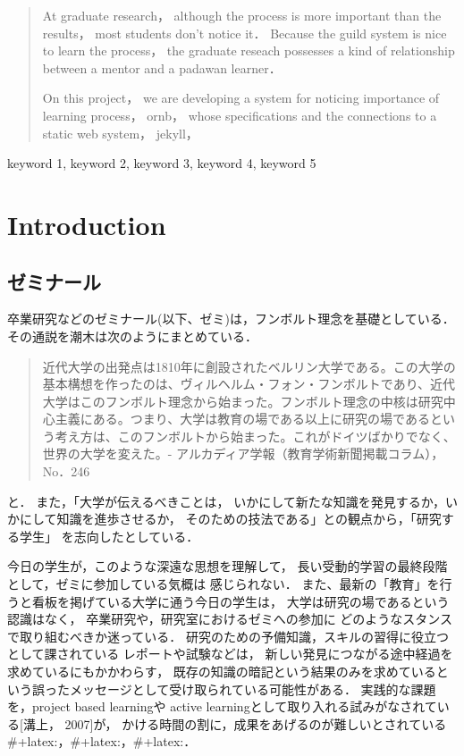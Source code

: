 \documentclass{hissymp}
\author{\texttt{S}}
\date{}
\begin{document}
\begin{abstract}
\label{sec:org0fa9d33}
At graduate research，
although the process is more important than the results，
most students don't notice it．
Because the guild system is nice to learn the process，
the graduate reseach possesses a kind of
relationship between
a mentor and a padawan learner．

On this project，
we are developing a system for
noticing importance of learning process，
ornb， whose specifications and
the connections to a static web system， jekyll，


\end{abstract}

\begin{keyword}
keyword 1, keyword 2, keyword 3, keyword 4, keyword 5
\end{keyword}

\maketitle
\section{Introduction}

\label{sec:orgb32ee20}
\subsection{ゼミナール}
\label{sec:orga8f1ffd}
卒業研究などのゼミナール(以下、ゼミ)は，フンボルト理念を基礎としている．その通説を潮木は次のようにまとめている．
\begin{quote}
近代大学の出発点は1810年に創設されたベルリン大学である。この大学の基本構想を作ったのは、ヴィルヘルム・フォン・フンボルトであり、近代大学はこのフンボルト理念から始まった。フンボルト理念の中核は研究中心主義にある。つまり、大学は教育の場である以上に研究の場であるという考え方は、このフンボルトから始まった。これがドイツばかりでなく、世界の大学を変えた。- アルカディア学報（教育学術新聞掲載コラム），No．246
\end{quote}
と． また，「大学が伝えるべきことは，
いかにして新たな知識を発見するか，いかにして知識を進歩させるか，
そのための技法である」との観点から，「研究する学生」
を志向したとしている．

今日の学生が，このような深遠な思想を理解して，
長い受動的学習の最終段階として，ゼミに参加している気概は
感じられない．
また、最新の「教育」を行うと看板を掲げている大学に通う今日の学生は，
大学は研究の場であるという認識はなく，
卒業研究や，研究室におけるゼミへの参加に
どのようなスタンスで取り組むべきか迷っている．
研究のための予備知識，スキルの習得に役立つとして課されている
レポートや試験などは，
新しい発見につながる途中経過を求めているにもかかわらす，
既存の知識の暗記という結果のみを求めているという誤ったメッセージとして受け取られている可能性がある．
実践的な課題を，project based learningや
active learningとして取り入れる試みがなされている[溝上， 2007]が，
かける時間の割に，成果をあげるのが難しいとされている\#+latex:\cite{Bell}，\#+latex:\cite{Settles}，\#+latex:\cite{溝上}．
\end{document}
